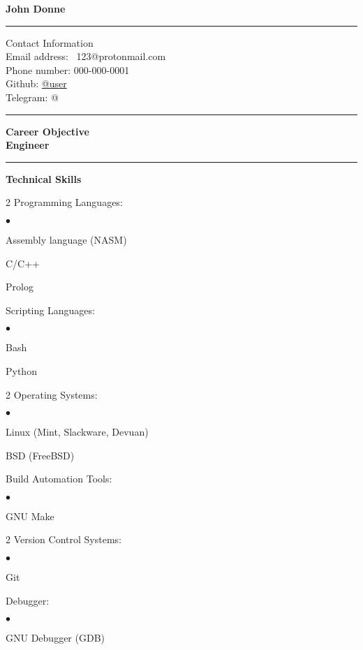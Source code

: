 \documentclass[oneside,final,12pt]{extreport}
\newenvironment{compactlist}{
	\begin{list}{{$\bullet$}}{
		\setlength\leftmargin{0.4cm}
		\setlength\partopsep{0pt}
		\setlength\parskip{0pt}
		\setlength\parsep{0pt}
		\setlength\topsep{0pt}
		\setlength\itemsep{0pt}
	}
}{
	\end{list}
}
\begin{document}
\bfseries
John Donne\\
\rule{\textwidth}{0.4pt}
Contact Information \\
\noindent
\mdseries
Email address: \
123@protonmail.com \\
Phone number:
000-000-0001 \\
Github: 
\href{https://github.com/user}{@user} \\
Telegram:
@ \\
\rule{\textwidth}{0.4pt}

\bfseries
Career Objective \\
\mdseries
Engineer \\
\rule{\textwidth}{0.4pt}

\bfseries
Technical Skills
\mdseries
\begin{multicols}{2}
Programming Languages:
	\begin{compactlist}
		\item Assembly language (NASM)
		\item C/C++
		\item Prolog
	\end{compactlist}
		Scripting Languages:
	\begin{compactlist}
		\item Bash
		\item Python
	\end{compactlist}
\end{multicols}

\begin{multicols}{2}
Operating Systems:
	\begin{compactlist}
		\item Linux (Mint, Slackware, Devuan)
		\item *BSD (FreeBSD)
	\end{compactlist}
Build Automation Tools:
	\begin{compactlist}
		\item GNU Make
	\end{compactlist}
\end{multicols}

\begin{multicols}{2}
Version Control Systems:
	\begin{compactlist}
		\item Git
	\end{compactlist}
	Debugger:
	\begin{compactlist}
		 \item GNU Debugger (GDB)
	\end{compactlist}
\end{multicols}
\end{document}
